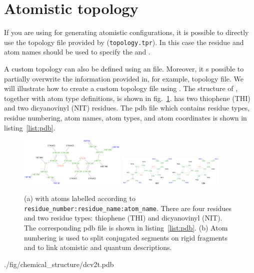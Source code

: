 \section{Atomistic topology}
\label{sec:atomistic}

If you are using \gromacs for generating atomistic configurations, it is possible to directly use the topology file provided by \gromacs (\texttt{topology.tpr}). In this case the \gromacs residue and atom names should be used to specify the  and . 

A custom topology can also be defined using an \xml file. Moreover, it s possible to partially overwrite the information provided in, for example, \gromacs topology file. We will illustrate how to create a custom topology file using \dcvt. The structure of \dcvt, together with atom type definitions, is shown in fig.~\ref{fig:dcv2t}. \dcvt has two thiophene (THI) and two dicyanovinyl (NIT) residues. The pdb file which contains residue types, residue numbering, atom names, atom types, and atom coordinates is shown in listing~\ref{list:pdb}.

\begin{figure}[ht]
\centering
\includegraphics[width=0.45\textwidth]{./fig/chemical_structure/dcv2t_atom_types}\,
\includegraphics[width=0.45\textwidth]{./fig/chemical_structure/dcv2t_gaussian}
\caption{\small (a) \dcvt with atoms labelled according to \texttt{residue\_number:residue\_name:atom\_name}. There are four residues and two residue types: thiophene (THI) and dicyanovinyl (NIT). The corresponding pdb file is shown in listing~\ref{list:pdb}. (b) Atom numbering is used to split conjugated segments on rigid fragments and to link atomistic and quantum descriptions.}
\label{fig:dcv2t}
\end{figure}

%
{./fig/chemical_structure/dcv2t.pdb}
